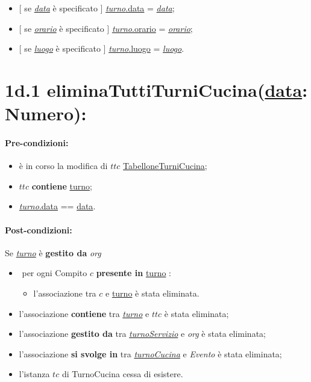  \begin{itemize}
     \item $[$ se \underline{\textit{data}} è specificato $]$ \underline{\textit{turno}.data} = \underline{\textit{data}};

    \item $[$ se \underline{\textit{orario}} è specificato $]$ \underline{\textit{turno}.orario} = \underline{\textit{orario}};

    \item $[$ se \underline{\textit{luogo}} è specificato $]$ \underline{\textit{turno}.luogo} = \underline{\textit{luogo}}.

\end{itemize}

\section*{1d.1 eliminaTuttiTurniCucina(\underline{data}: Numero):}

\paragraph{Pre-condizioni:}
\begin{itemize}
 \item è in corso la modifica di $ttc$ \underline{TabelloneTurniCucina};
 \item $ttc$ \textbf{contiene} \underline{turno};
 \item \underline{\textit{turno}.data} == \underline{data}.
\end{itemize}

\paragraph{Post-condizioni:} Se \underline{\textit{turno}} è \textbf{gestito da} {\textit{org}}

\begin{itemize}
   \item \textlangle $ $ per ogni Compito $c$ \textbf{presente in} \underline{turno} \textrangle:
    \begin{itemize}
        \item l'associazione tra $c$ e \underline{turno} è stata eliminata.
    \end{itemize}
    \item l'associazione \textbf{contiene} tra \underline{\textit{turno}} e $ttc$ è stata eliminata;
    \item l'associazione \textbf{gestito da} tra \underline{\textit{turnoServizio}} e \textit{org} è stata eliminata;
\item l'associazione \textbf{si svolge in} tra \underline{\textit{turnoCucina}} e \textit{Evento} è stata eliminata;
    \item l'istanza $tc$ di TurnoCucina cessa di esistere.
\end{itemize}

